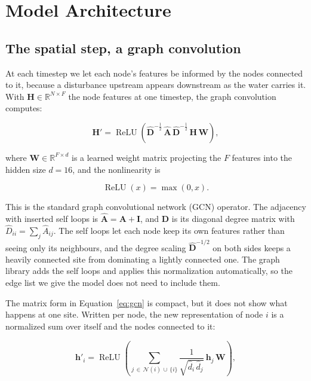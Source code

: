 \documentclass{article}
\begin{document}
\section{Model Architecture}
\label{sec:architecture}

\subsection{The spatial step, a graph convolution}
\label{sec:gcn}

At each timestep we let each node's features be informed by the nodes connected
to it, because a disturbance upstream appears downstream as the water carries
it. With $\mathbf{H} \in \mathbb{R}^{N \times F}$ the node features at one
timestep, the graph convolution \citep{kipf2017gcn} computes:

\begin{equation}
  \label{eq:gcn}
  \mathbf{H}' = \operatorname{ReLU}\!\left( \hat{\mathbf{D}}^{-\frac{1}{2}} \, \hat{\mathbf{A}} \, \hat{\mathbf{D}}^{-\frac{1}{2}} \, \mathbf{H} \, \mathbf{W} \right),
\end{equation}

where $\mathbf{W} \in \mathbb{R}^{F \times d}$ is a learned weight matrix
projecting the $F$ features into the hidden size $d = 16$, and the nonlinearity
is

\begin{equation}
  \label{eq:relu}
  \operatorname{ReLU}(x) = \max(0, x).
\end{equation}

This is the standard graph convolutional network (GCN) operator. The adjacency
with inserted self loops is $\hat{\mathbf{A}} = \mathbf{A} + \mathbf{I}$, and
$\hat{\mathbf{D}}$ is its diagonal degree matrix with $\hat{D}_{ii} = \sum_j
\hat{A}_{ij}$. The self loops let each node keep its own features rather than
seeing only its neighbours, and the degree scaling $\hat{\mathbf{D}}^{-1/2}$ on
both sides keeps a heavily connected site from dominating a lightly connected
one. The graph library \citep{fey2019pyg} adds the self loops and applies this
normalization automatically, so the edge list we give the model does not need
to include them.

The matrix form in Equation~\ref{eq:gcn} is compact, but it does not show what
happens at one site. Written per node, the new representation of node $i$ is a
normalized sum over itself and the nodes connected to it:

\begin{equation}
  \label{eq:gcn-per-node}
  \mathbf{h}'_i = \operatorname{ReLU}\!\left( \sum_{j \,\in\, \mathcal{N}(i) \,\cup\, \{i\}} \frac{1}{\sqrt{\hat{d}_i \, \hat{d}_j}} \, \mathbf{h}_j \, \mathbf{W} \right),
\end{equation}
\end{document}
